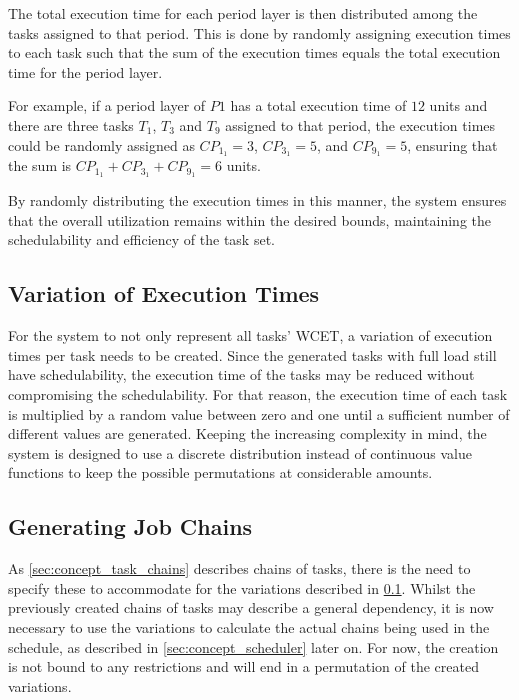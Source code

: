 The total execution time for each period layer is then distributed among the tasks assigned to that period. This is done by randomly assigning execution times to each task such that the sum of the execution times equals the total execution time for the period layer.

For example, if a period layer of $P1$ has a total execution time of $12$ units and there are three tasks $T_1$, $T_3$ and $T_9$ assigned to that period, the execution times could be randomly assigned as $CP_{1_1} = 3$, $CP_{3_1} = 5$, and $CP_{9_1} = 5$, ensuring that the sum is \( CP_{1_1} + CP_{3_1} + CP_{9_1} = 6 \) units.

By randomly distributing the execution times in this manner, the system ensures that the overall utilization remains within the desired bounds, maintaining the schedulability and efficiency of the task set.

\subsection{Variation of Execution Times}\label{sec:concept_lower_execution_times}
For the system to not only represent all tasks' \ac{WCET}, a variation of execution times per task needs to be created.
Since the generated tasks with full load still have schedulability, the execution time of the tasks may be reduced without compromising the schedulability.
For that reason, the execution time of each task is multiplied by a random value between zero and one until a sufficient number of different values are generated.
Keeping the increasing complexity in mind, the system is designed to use a discrete distribution instead of continuous value functions to keep the possible permutations at considerable amounts.

\subsection{Generating Job Chains}\label{sec:concept_job_chains}
As \cref{sec:concept_task_chains} describes chains of tasks, there is the need to specify these to accommodate for the variations described in \cref{sec:concept_lower_execution_times}.
Whilst the previously created chains of tasks may describe a general dependency, it is now necessary to use the variations to calculate the actual chains being used in the schedule, as described in \cref{sec:concept_scheduler} later on.
For now, the creation is not bound to any restrictions and will end in a permutation of the created variations.

